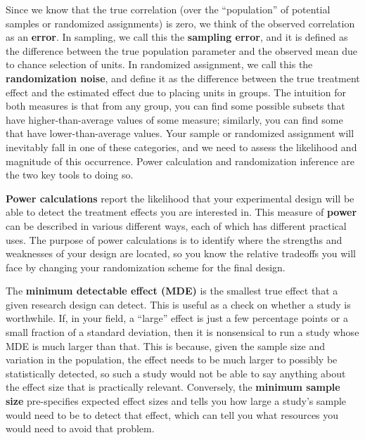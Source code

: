 Since we know that the true correlation
(over the ``population'' of potential samples or randomized assignments)
is zero, we think of the observed correlation as an \textbf{error}.
In sampling, we call this the \textbf{sampling error},
and it is defined as the difference between the true population parameter
and the observed mean due to chance selection of units.
In randomized assignment, we call this the \textbf{randomization noise},
and define it as the difference between the true treatment effect
and the estimated effect due to placing units in groups.
The intuition for both measures is that from any group,
you can find some possible subsets that have higher-than-average values of some measure;
similarly, you can find some that have lower-than-average values.
Your sample or randomized assignment will inevitably fall in one of these categories,
and we need to assess the likelihood and magnitude of this occurrence.
Power calculation and randomization inference are the two key tools to doing so.

\textbf{Power calculations} report the likelihood that your experimental design
will be able to detect the treatment effects you are interested in.
This measure of \textbf{power} can be described in various different ways,
each of which has different practical uses.
The purpose of power calculations is to identify where the strengths and weaknesses
of your design are located, so you know the relative tradeoffs you will face
by changing your randomization scheme for the final design.

The \textbf{minimum detectable effect (MDE)}
is the smallest true effect that a given research design can detect.
This is useful as a check on whether a study is worthwhile.
If, in your field, a ``large'' effect is just a few percentage points
or a small fraction of a standard deviation,
then it is nonsensical to run a study whose MDE is much larger than that.
This is because, given the sample size and variation in the population,
the effect needs to be much larger to possibly be statistically detected,
so such a study would not be able to say anything about the effect size that is practically relevant.
Conversely, the \textbf{minimum sample size} pre-specifies expected effect sizes
and tells you how large a study's sample would need to be to detect that effect,
which can tell you what resources you would need to avoid that problem.

